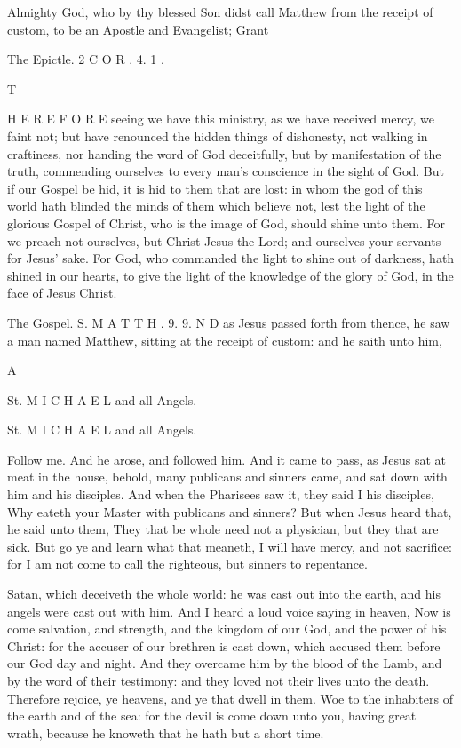 Almighty God, who by thy blessed Son didst call Matthew from the receipt of custom, to be an Apostle and Evangelist; Grant

The Epictle. 2 C O R . 4. 1 .

T

H E R E F O R E seeing we have this ministry, as we have received mercy, we faint not; but have renounced the hidden things of dishonesty, not walking in craftiness, nor handing the word of God deceitfully, but by manifestation of the truth, commending ourselves to every man’s conscience in the sight of God. But if our Gospel be hid, it is hid to them that are lost: in whom the god of this world hath blinded the minds of them which believe not, lest the light of the glorious Gospel of Christ, who is the image of God, should shine unto them. For we preach not ourselves, but Christ Jesus the Lord; and ourselves your servants for Jesus’ sake. For God, who commanded the light to shine out of darkness, hath shined in our hearts, to give the light of the knowledge of the glory of God, in the face of Jesus Christ.

The Gospel. S. M A T T H . 9. 9. N D as Jesus passed forth from thence, he saw a man named Matthew, sitting at the receipt of custom: and he saith unto him,

A

St. M I C H A E L and all Angels.

St. M I C H A E L and all Angels.

Follow me. And he arose, and followed him. And it came to pass, as Jesus sat at meat in the house, behold, many publicans and sinners came, and sat down with him and his disciples. And when the Pharisees saw it, they said I his disciples, Why eateth your Master with publicans and sinners? But when Jesus heard that, he said unto them, They that be whole need not a physician, but they that are sick. But go ye and learn what that meaneth, I will have mercy, and not sacrifice: for I am not come to call the righteous, but sinners to repentance.

Satan, which deceiveth the whole world: he was cast out into the earth, and his angels were cast out with him. And I heard a loud voice saying in heaven, Now is come salvation, and strength, and the kingdom of our God, and the power of his Christ: for the accuser of our brethren is cast down, which accused them before our God day and night. And they overcame him by the blood of the Lamb, and by the word of their testimony: and they loved not their lives unto the death. Therefore rejoice, ye heavens, and ye that dwell in them. Woe to the inhabiters of the earth and of the sea: for the devil is come down unto you, having great wrath, because he knoweth that he hath but a short time.

